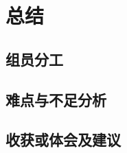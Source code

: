\documentclass[11pt,a4paper]{article}
\renewcommand{\_}{\origunderscore\allowbreak}
\begin{document}


\section{总结}

\subsection{组员分工}

\subsection{难点与不足分析}

\subsection{收获或体会及建议}
\end{document}
